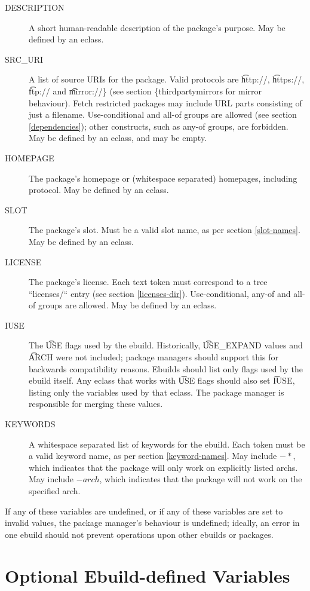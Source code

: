 \begin{description}
\item[DESCRIPTION] A short human-readable description of the package's purpose. May be defined by an
    eclass.
\item[SRC\_URI] A list of source URIs for the package. Valid protocols are \t{http://},
    \t{https://}, \t{ftp://} and \t{mirror://\} (see section \{thirdpartymirrors} for mirror behaviour).
    Fetch restricted packages may include URL parts consisting of just a filename.  Use-conditional and
    all-of groups are allowed (see section \ref{dependencies}); other constructs,
    such as any-of groups, are forbidden. May be defined by an eclass, and may be empty.
\item[HOMEPAGE] The package's homepage or (whitespace separated) homepages, including protocol. May
    be defined by an eclass.
\item[SLOT] The package's slot. Must be a valid slot name, as per section \ref{slot-names}. May
    be defined by an eclass.
\item[LICENSE] The package's license. Each text token must correspond to a tree ``licenses/`` entry
    (see section \ref{licenses-dir}). Use-conditional, any-of and all-of groups are allowed.
    May be defined by an eclass.
\item[IUSE] The \t{USE} flags used by the ebuild. Historically, \t{USE\_EXPAND} values and \t{ARCH}
    were not included; package managers should support this for backwards compatibility reasons. Ebuilds
    should list only flags used by the ebuild itself. Any eclass that works with \t{USE} flags
    should also set \t{IUSE}, listing only the variables used by that eclass. The package manager is
    responsible for merging these values.
\item[KEYWORDS] A whitespace separated list of keywords for the ebuild. Each token must be a
    valid keyword name, as per section \ref{keyword-names}. May include $-*$, which
    indicates that the package will only work on explicitly listed archs. May include $-arch$,
    which indicates that the package will not work on the specified arch.
\end{description}

If any of these variables are undefined, or if any of these variables are set to invalid values,
the package manager's behaviour is undefined; ideally, an error in one ebuild should not prevent
operations upon other ebuilds or packages.

\section{Optional Ebuild-defined Variables}

